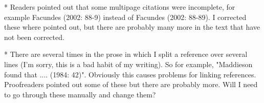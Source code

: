   *   Readers pointed out that some multipage citations were incomplete, for example Facundes (2002: 88-9) instead of Facundes (2002: 88-89). I corrected these where pointed out, but there are probably many more in the text that have not been corrected.
  
  *   There are several times in the prose in which I split a reference over several lines (I'm sorry, this is a bad habit of my writing). So for example, "Maddieson found that .... (1984: 42)". Obviously this causes problems for linking references. Proofreaders pointed out some of these but there are probably more. Will I need to go through these manually and change them?

  
  
